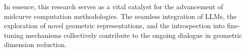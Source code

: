 \documentclass[10pt, conference]{IEEEtran}
\begin{document}
%
%

In essence, this research serves as a vital catalyst for the advancement of midcurve computation methodologies. The seamless integration of LLMs, the exploration of novel geometric representations, and the introspection into fine-tuning mechanisms collectively contribute to the ongoing dialogue in geometric dimension reduction. 






\end{document}
